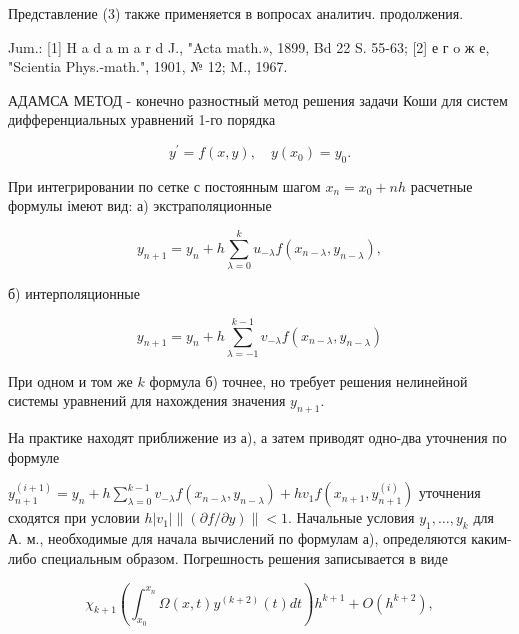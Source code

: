 \documentclass[10pt]{article}
\begin{document}
Представление (3) также применяется в вопросах аналитич. продолжения.



Jum.: [1] H a d a m a r d J., "Acta math.», 1899, Bd 22 S. 55-63; [2] е г o ж е, "Scientia Phys.-math.", 1901, № 12; M., 1967.



АДАМСА МЕТОД - конечно разностный метод решения задачи Коши для систем дифференциальных уравнений 1-го порядка



\[

y^{\prime}=f(x, y), \quad y\left(x_{0}\right)=y_{0} .

\]



При интегрировании по сетке с постоянным шагом $x_{n}=x_{0}+n h$ расчетные формулы імеют вид: а) экстраполяционные



\[

y_{n+1}=y_{n}+h \sum_{\lambda=0}^{k} u_{-\lambda} f\left(x_{n-\lambda}, y_{n-\lambda}\right),

\]



б) интерполяционные



\[

y_{n+1}=y_{n}+h \sum_{\lambda=-1}^{k-1} v_{-\lambda} f\left(x_{n-\lambda}, y_{n-\lambda}\right)

\]



При одном и том же $k$ формула б) точнее, но требует решения нелинейной системы уравнений для нахождения значения $y_{n+1}$.



На практике находят приближение из а), а затем приводят одно-два уточнения по формуле



$y_{n+1}^{(i+1)}=y_{n}+h \sum_{\lambda=0}^{k-1} v_{-\lambda} f\left(x_{n-\lambda}, y_{n-\lambda}\right)+h v_{1} f\left(x_{n+1}, y_{n+1}^{(i)}\right)$ уточнения сходятся при условии $h\left|v_{1}\right|\|(\partial f / \partial y)\|<1$. Начальные условия $y_{1}, \ldots, y_{k}$ для А. м., необходимые для начала вычислений по формулам а), определяются каким-либо специальным образом. Погрешность решения записывается в виде



\[

\chi_{k+1}\left(\int_{x_{0}}^{x_{n}} \Omega(x, t) y^{(k+2)}(t) d t\right) h^{k+1}+O\left(h^{k+2}\right),

\]
\end{document}

